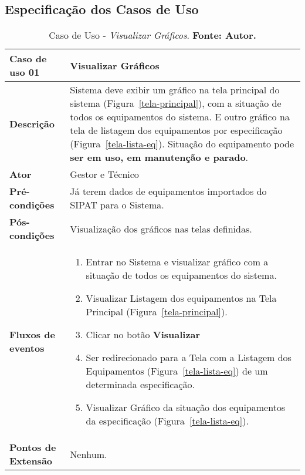 \begin{apendicesenv}

\partapendices

\chapter{Especificação dos Casos de Uso}
\label{esp-uc}


\begin{table}[H]
\centering
\caption{Caso de Uso - \textit{Visualizar Gráficos}. \textbf{Fonte: Autor.}}
\label{uc01}
\begin{tabular}{ | p{5cm} | p{10cm} |  }
\hline
	\textbf{Caso de uso 01} & Visualizar Gráficos \\ \hline
	\textbf{Descrição} & Sistema deve exibir um gráfico na tela principal do sistema (Figura~\ref{tela-principal}), com a situação de todos os equipamentos do sistema. E outro gráfico na tela de listagem dos equipamentos por especificação (Figura~\ref{tela-lista-eq}). Situação do equipamento pode \textbf{ser em uso, em manutenção e parado}. \\ \hline
	\textbf{Ator} & Gestor e Técnico \\ \hline
	\textbf{Pré-condições} & Já terem dados de equipamentos importados do SIPAT para o Sistema. \\ \hline
	\textbf{Pós-condições} & Visualização dos gráficos nas telas definidas. \\ \hline
	\textbf{Fluxos de eventos} & \begin{enumerate}
									\item Entrar no Sistema e visualizar gráfico com a situação de todos os equipamentos do sistema.       
									\item Visualizar Listagem dos equipamentos na Tela Principal (Figura~\ref{tela-principal}).
									\item Clicar no botão \textbf{Visualizar}
									\item Ser redirecionado para a Tela com a Listagem dos Equipamentos (Figura~\ref{tela-lista-eq}) de um determinada especificação.    
									\item Visualizar Gráfico da situação dos equipamentos da especificação (Figura~\ref{tela-lista-eq}).
								 \end{enumerate}   \\ \hline
	\textbf{Pontos de Extensão} & Nenhum. \\ \hline
\end{tabular}
\end{table}


\end{apendicesenv}
